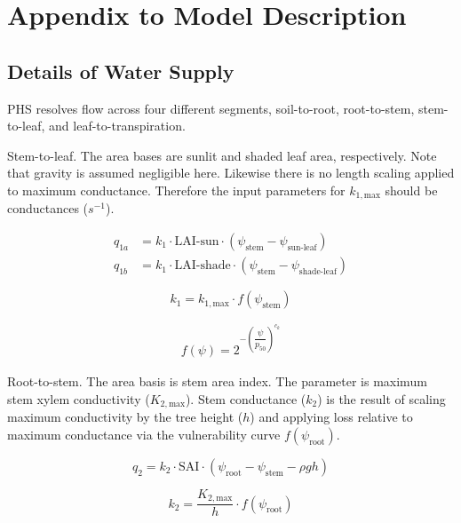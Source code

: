 \documentclass[draft,linenumbers]{agujournal}
\begin{document}
\section{Appendix to Model Description}

\subsection{Details of Water Supply}

PHS resolves flow across four different segments, soil-to-root, root-to-stem, stem-to-leaf, and leaf-to-transpiration.

Stem-to-leaf. The area bases are sunlit and shaded leaf area, respectively. 
Note that gravity is assumed negligible here. 
Likewise there is no length scaling applied to maximum conductance. 
Therefore the input parameters for $k_{1,\text{max}}$ should be conductances ($s^{-1}$).

\begin{linenomath*} \begin{equation} \begin{aligned}
q_{1a} &= k_{1} \cdot \text{LAI-sun}  \cdot \left( \psi_{\text{stem}}-\psi_{\text{sun-leaf}}\right) \\
q_{1b} &= k_{1} \cdot \text{LAI-shade} \cdot  \left( \psi_{\text{stem}}-\psi_{\text{shade-leaf}}\right)
\end{aligned} \end{equation} \end{linenomath*}

\begin{linenomath*} \begin{equation}
k_{1} = k_{1,\text{max}} \cdot f\left(\psi_{\text{stem}}\right)
\end{equation} \end{linenomath*}

\begin{linenomath*} \begin{equation} \begin{aligned}
f\left(\psi\right)=2^{-\left(\dfrac{\psi}{p_{50}}\right)^{c_k}}
\end{aligned} \end{equation} \end{linenomath*}

Root-to-stem. The area basis is stem area index. 
The parameter is maximum stem xylem conductivity ($K_{2,\text{max}}$).
Stem conductance ($k_2$) is the result of scaling maximum conductivity by the tree height ($h$)
and applying loss relative to maximum conductance via the vulnerability curve $f\left(\psi_{\text{root}}\right)$. 
\begin{linenomath*} \begin{equation}
q_2 = k_2 \cdot  \text{SAI}  \cdot \left( \psi_{\text{root}}-\psi_{\text{stem}}-\rho g h\right)
\end{equation} \end{linenomath*}
\begin{linenomath*} \begin{equation}
k_2 = \dfrac{K_{2,\text{max}}}{h} \cdot f\left(\psi_{\text{root}}\right)
\end{equation} \end{linenomath*}
\end{document}
